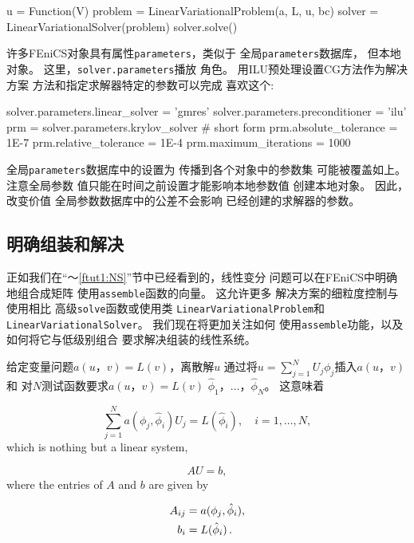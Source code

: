 \begin{python}
u = Function(V)
problem = LinearVariationalProblem(a, L, u, bc)
solver = LinearVariationalSolver(problem)
solver.solve()
\end{python}

许多FEniCS对象具有属性\texttt{parameters}，类似于
全局\texttt{parameters}数据库，
但本地对象。 这里，\texttt{solver.parameters}播放
角色。 用ILU预处理设置CG方法作为解决方案
方法和指定求解器特定的参数可以完成
喜欢这个:

\begin{python}
solver.parameters.linear_solver = 'gmres'
solver.parameters.preconditioner = 'ilu'
prm = solver.parameters.krylov_solver  # short form
prm.absolute_tolerance = 1E-7
prm.relative_tolerance = 1E-4
prm.maximum_iterations = 1000
\end{python}
全局\texttt{parameters}数据库中的设置为
传播到各个对象中的参数集
可能被覆盖如上。 注意全局参数
值只能在时间之前设置才能影响本地参数值
创建本地对象。 因此，改变价值
全局参数数据库中的公差不会影响
已经创建的求解器的参数。

\subsection{明确组装和解决}
\label{ch:poisson0:linalg}


正如我们在“〜\ref{ftut1:NS}”节中已经看到的，线性变分
问题可以在FEniCS中明确地组合成矩阵
使用\texttt{assemble}函数的向量。 这允许更多
解决方案的细粒度控制与使用相比
高级\texttt{solve}函数或使用类
\texttt{LinearVariationalProblem}和
\texttt{LinearVariationalSolver}。 我们现在将更加关注如何
使用\texttt{assemble}功能，以及如何将它与低级别组合
要求解决组装的线性系统。

给定变量问题$a(u，v)=L(v)$，离散解$u$
通过将$u=\sum_{j=1}^N U_j \phi_j$插入$a(u，v)$和
对$N$测试函数要求$a(u，v)=L(v)$
$\hat\phi_1，\ldots，\hat\phi_N$。 这意味着

\begin{equation*}
\sum_{j=1}^N a(\phi_j,\hat\phi_i) U_j = L(\hat\phi_i),\quad i=1,\ldots,N,
\end{equation*}
which is nothing but a linear system,

\begin{equation*}
  AU = b,
\end{equation*}
where the entries of $A$ and $b$ are given by

\begin{align*}
  A_{ij} &= a(\phi_j, \hat{\phi}_i), \\
  b_i &= L(\hat\phi_i)\thinspace .
\end{align*}

